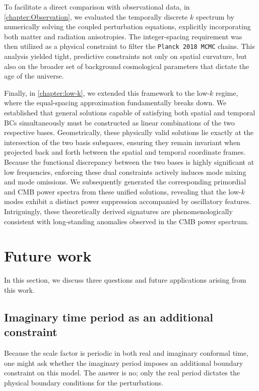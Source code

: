 To facilitate a direct comparison with observational data, in \cref{chapter:Observation}, we evaluated the temporally discrete \(k\) spectrum by numerically solving the coupled perturbation equations, explicitly incorporating both matter and radiation anisotropies. The integer-spacing requirement was then utilized as a physical constraint to filter the \texttt{Planck 2018 MCMC} chains. This analysis yielded tight, predictive constraints not only on spatial curvature, but also on the broader set of background cosmological parameters that dictate the age of the universe. 

Finally, in \cref{chapter:low-k}, we extended this framework to the low-\(k\) regime, where the equal-spacing approximation fundamentally breaks down. We established that general solutions capable of satisfying both spatial and temporal BCs simultaneously must be constructed as linear combinations of the two respective bases. Geometrically, these physically valid solutions lie exactly at the intersection of the two basis subspaces, ensuring they remain invariant when projected back and forth between the spatial and temporal coordinate frames. Because the functional discrepancy between the two bases is highly significant at low frequencies, enforcing these dual constraints actively induces mode mixing and mode omissions. We subsequently generated the corresponding primordial and CMB power spectra from these unified solutions, revealing that the low-\(k\) modes exhibit a distinct power suppression accompanied by oscillatory features. Intriguingly, these theoretically derived signatures are phenomenologically consistent with long-standing anomalies observed in the CMB power spectrum.

\section{Future work}

In this section, we discuss three questions and future applications arising from this work. 

\subsection{Imaginary time period as an additional constraint}
Because the scale factor is periodic in both real and imaginary conformal time, one might ask whether the imaginary period imposes an additional boundary constraint on this model. The answer is no; only the real period dictates the physical boundary conditions for the perturbations. 

